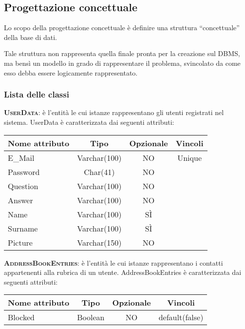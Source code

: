 \subsection{Progettazione concettuale}
Lo scopo della progettazione concettuale è definire una struttura ``concettuale'' della base di dati.

Tale struttura non rappresenta quella finale pronta per la creazione sul DBMS, ma bensì un modello in grado di rappresentare il problema, svincolato da come esso debba essere logicamente rappresentato.

\subsubsection{Lista delle classi}

\begin{description}
	\item{\scshape\bfseries UserData}: è l'entità le cui istanze rappresentano gli utenti registrati nel sistema. UserData è caratterizzata dai seguenti attributi:

\begin{center}
\begin{tabular}{lccc}
\toprule
Nome attributo & Tipo & Opzionale & Vincoli\\
\midrule
E\_Mail & Varchar(100) & NO & Unique\\
Password & Char(41) & NO &\\
Question & Varchar(100) & NO &\\
Answer & Varchar(100) & NO &\\
Name & Varchar(100) & SÌ &\\
Surname & Varchar(100) & SÌ &\\
Picture & Varchar(150) & NO &\\
\bottomrule
\end{tabular}
\end{center}

	\item{\scshape\bfseries AddressBookEntries}: è l'entità le cui istanze rappresentano i contatti appartenenti alla rubrica di un utente. AddressBookEntries è caratterizzata dai seguenti attributi:
	
\begin{center}
\begin{tabular}{lccc}
\toprule
Nome attributo & Tipo & Opzionale & Vincoli\\
\midrule
Blocked & Boolean & NO & default(false)\\
\bottomrule
\end{tabular}
\end{center}


\end{description}
